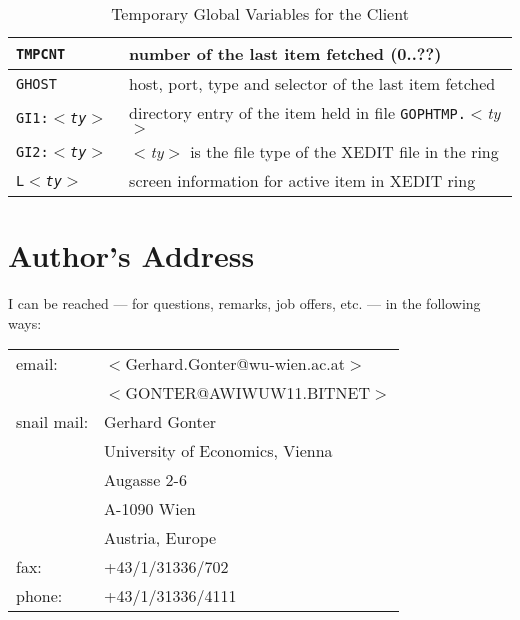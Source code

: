 \begin{table}
\caption{Temporary Global Variables for the Client}\label{clglv-t}
\rule{0mm}{2mm}
\begin{center}
\begin{minipage}{\textwidth}
\begin{tabular}{|l|l|}\hline 
{\tt  TMPCNT     } & number of the last item fetched (0..??)\\
\hline
{\tt  GHOST      } & host, port, type and selector of the last item fetched\\
\hline
{\tt  GI1:{\sl{$<$ty$>$}}  } &  directory entry of the item held in 
                                file {\tt GOPHTMP.}{\sl{$<$ty$>$}}\\
{\tt  GI2:{\sl{$<$ty$>$}}  } &  {\sl $<$ty$>$} is the file type of the
                                XEDIT file in the ring\\ \hline
{\tt  L{\sl{$<$ty$>$}}     } &  screen information for active item in
                                XEDIT ring\\ 
\hline
\end{tabular}
\end{minipage}
\end{center}
\end{table}

\rule{0mm}{5mm}




\section{Author's Address}\label{gg.addr}

I can be reached --- for questions, remarks, job offers, etc. ---
in the following ways:\\[2.5ex]

\noindent\begin{tabular}{ll}
email:          & $<$Gerhard.Gonter@wu-wien.ac.at$>$\\
                & $<$GONTER@AWIWUW11.BITNET$>$\\[2ex]
snail mail:     & Gerhard Gonter\\
                & University of Economics, Vienna\\
                & Augasse 2-6\\
                & A-1090 Wien\\
                & Austria, Europe\\[2ex]
fax:            & +43/1/31336/702\\[2ex]
phone:          & +43/1/31336/4111 \\
\end{tabular}



%




